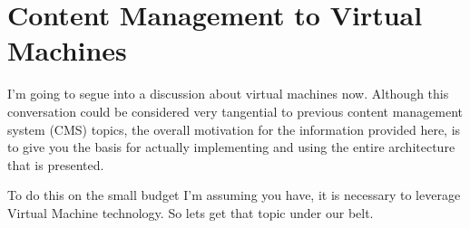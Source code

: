 \section{Content Management to Virtual Machines}

I'm going to segue into a discussion about virtual machines now.
Although this conversation could be considered very tangential to
previous content management system (CMS) topics, the overall
motivation for the information provided here, is to give you the basis
for actually implementing and using the entire architecture that is
presented.
	
To do this on the small budget I'm assuming you have, it is necessary
to leverage Virtual Machine technology.  So lets get that topic under
our belt.
\clearpage